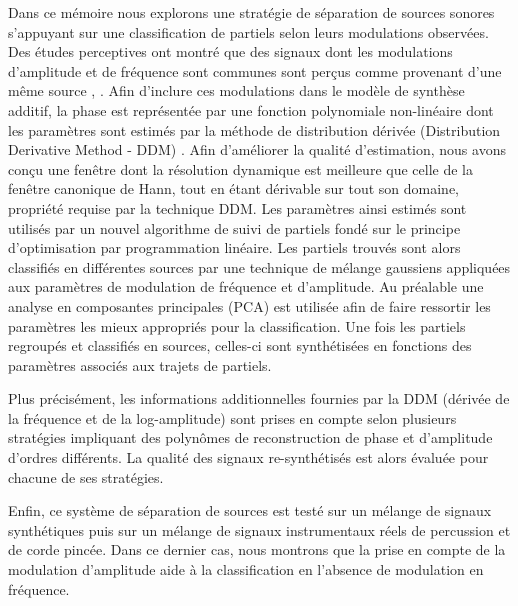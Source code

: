 Dans ce mémoire nous explorons une stratégie de séparation de sources sonores
s’appuyant sur une classification de partiels selon leurs modulations observées.
Des études perceptives ont montré que des signaux dont les modulations
d’amplitude et de fréquence sont communes sont perçus comme provenant d’une même
source \cite{mcadams1989segregation}, \cite{marin1991segregation}. Afin
d’inclure ces modulations dans le modèle de synthèse additif, la phase est
représentée par une fonction polynomiale non-linéaire dont les paramètres sont
estimés par la méthode de distribution dérivée (Distribution Derivative Method -
DDM) \cite{betser2009sinusoidal}. Afin d’améliorer la qualité d’estimation, nous
avons conçu une fenêtre dont la résolution dynamique est meilleure que celle de
la fenêtre canonique de Hann, tout en étant dérivable sur tout son domaine,
propriété requise par la technique DDM. Les paramètres ainsi estimés sont
utilisés par un nouvel algorithme de suivi de partiels fondé sur le principe
d’optimisation par programmation linéaire. Les partiels trouvés sont alors
classifiés en différentes sources par une technique de mélange gaussiens
appliquées aux paramètres de modulation de fréquence et d’amplitude. Au
préalable une analyse en composantes principales (PCA) est utilisée afin de
faire ressortir les paramètres les mieux appropriés pour la classification.  Une
fois les partiels regroupés et classifiés en sources, celles-ci sont
synthétisées en fonctions des paramètres associés aux trajets de partiels.

Plus précisément, les informations additionnelles fournies par la DDM (dérivée
de la fréquence et de la log-amplitude) sont prises en compte selon plusieurs
stratégies impliquant des polynômes de reconstruction de phase et d’amplitude
d’ordres différents. La qualité des signaux re-synthétisés est alors évaluée
pour chacune de ses stratégies. 

Enfin, ce système de séparation de sources est testé sur un mélange de signaux
synthétiques puis sur un mélange de signaux instrumentaux réels de percussion et
de corde pincée. Dans ce dernier cas, nous montrons que la prise en compte de la
modulation d’amplitude aide à la classification en l’absence de modulation en
fréquence.
